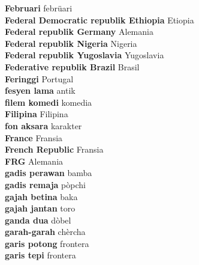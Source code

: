 \textbf{ Februari  } febrüari \\
\textbf{ Federal Democratic republik Ethiopia  } Etiopia \\
\textbf{ Federal republik Germany  } Alemania \\
\textbf{ Federal republik Nigeria  } Nigeria \\
\textbf{ Federal republik Yugoslavia  } Yugoslavia \\
\textbf{ Federative republik Brazil  } Brasil \\
\textbf{ Feringgi  } Portugal \\
\textbf{ fesyen lama  } antik \\
\textbf{ filem komedi  } komedia \\
\textbf{ Filipina  } Filipina \\
\textbf{ fon aksara  } karakter \\
\textbf{ France  } Fransia \\
\textbf{ French Republic  } Fransia \\
\textbf{ FRG  } Alemania \\
\textbf{ gadis perawan  } bamba \\
\textbf{ gadis remaja  } pòpchi \\
\textbf{ gajah betina  } baka \\
\textbf{ gajah jantan  } toro \\
\textbf{ ganda dua  } dòbel \\
\textbf{ garah-garah  } chèrcha \\
\textbf{ garis potong  } frontera \\
\textbf{ garis tepi  } frontera \\

